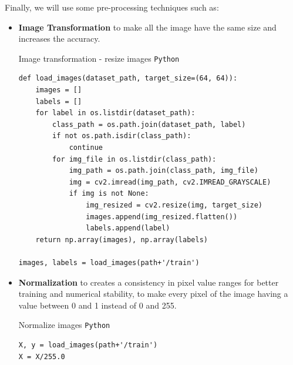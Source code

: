 \documentclass{modeleRapport}
\begin{document}
Finally, we will use some pre-processing techniques such as:\\
\begin{itemize}

\item \textbf{Image Transformation} to make all the image have the same size and increases the accuracy.\\

\begin{codebox}{Image transformation - resize images \texttt{Python}}
\begin{verbatim}
def load_images(dataset_path, target_size=(64, 64)):
    images = []
    labels = []
    for label in os.listdir(dataset_path):
        class_path = os.path.join(dataset_path, label)
        if not os.path.isdir(class_path):
            continue
        for img_file in os.listdir(class_path):
            img_path = os.path.join(class_path, img_file)
            img = cv2.imread(img_path, cv2.IMREAD_GRAYSCALE) 
            if img is not None:
                img_resized = cv2.resize(img, target_size) 
                images.append(img_resized.flatten())
                labels.append(label)
    return np.array(images), np.array(labels)

images, labels = load_images(path+'/train')
\end{verbatim}
\end{codebox}

\item \textbf{Normalization} to creates a consistency in pixel value ranges for better training and numerical stability, to make every pixel of the image having a value between 0 and 1 instead of 0 and 255.\\

\begin{codebox}{Normalize images \texttt{Python}}
\begin{verbatim}
X, y = load_images(path+'/train')
X = X/255.0
\end{verbatim}
\end{codebox}

\end{itemize}
\end{document}
